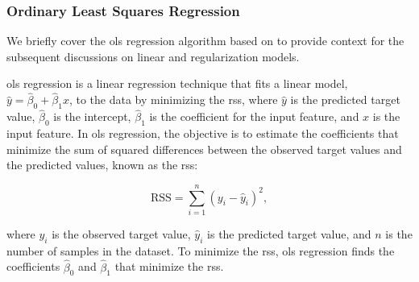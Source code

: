\subsubsection{Ordinary Least Squares Regression}\label{sec:ols}
We briefly cover the \gls{ols} regression algorithm based on \citet{James2023AnIS} to provide context for the subsequent discussions on linear and regularization models.

\gls{ols} regression is a linear regression technique that fits a linear model, $\hat{y} = \hat{\beta}_0 + \hat{\beta}_1 x$, to the data by minimizing the \gls{rss}, where $\hat{y}$ is the predicted target value, $\hat{\beta}_0$ is the intercept, $\hat{\beta}_1$ is the coefficient for the input feature, and $x$ is the input feature.
In \gls{ols} regression, the objective is to estimate the coefficients that minimize the sum of squared differences between the observed target values and the predicted values, known as the \gls{rss}:

$$
\text{RSS} = \sum_{i=1}^{n} (y_i - \hat{y}_i)^2,
$$

where $y_i$ is the observed target value, $\hat{y}_i$ is the predicted target value, and $n$ is the number of samples in the dataset.
To minimize the \gls{rss}, \gls{ols} regression finds the coefficients $\hat{\beta}_0$ and $\hat{\beta}_1$ that minimize the \gls{rss}.